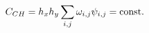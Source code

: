 \documentclass[preview]{standalone}
\begin{document}
\begin{align*}
\special{dvisvgm:raw <g id='unique000'>}C_{CH}=h_xh_y\sum_{i,j}\omega_{i,j}\psi_{i,j} = \text{const.}\special{dvisvgm:raw </g>}
\end{align*}
\end{document}
